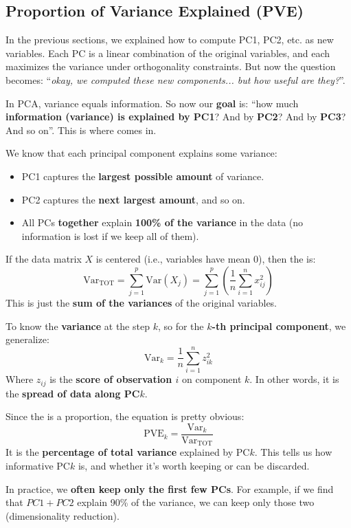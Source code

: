 \subsection{Proportion of Variance Explained (PVE)}

In the previous sections, we explained how to compute PC1, PC2, etc. as new variables. Each PC is a linear combination of the original variables, and each maximizes the variance under orthogonality constraints. But now the question becomes: ``\emph{okay, we computed these new components... but how useful are they?}''.

\highspace
In PCA, variance equals information. So now our \textbf{goal} is: ``how much \textbf{information (variance) is explained by PC1}? And by \textbf{PC2}? And by \textbf{PC3}? And so on''. This is where  comes in.

\highspace
We know that each principal component explains some variance:
\begin{itemize}
    \item PC1 captures the \textbf{largest possible amount} of variance.
    \item PC2 captures the \textbf{next largest amount}, and so on.
    \item All PCs \textbf{together} explain \textbf{100\% of the variance} in the data (no information is lost if we keep all of them).
\end{itemize}
If the data matrix $X$ is centered (i.e., variables have mean 0), then the  is:
\begin{equation}
    \text{Var}_{\text{TOT}} = \displaystyle\sum_{j=1}^{p} \text{Var}(X_{j}) = \displaystyle\sum_{j=1}^{p} \left( \dfrac{1}{n} \displaystyle\sum_{i=1}^{n} x_{ij}^{2} \right)
\end{equation}
This is just the \textbf{sum of the variances} of the original variables.

\highspace
To know the \textbf{variance} at the step $k$, so for the \textbf{$k$-th principal component}, we generalize:
\begin{equation}
    \text{Var}_{k} = \dfrac{1}{n} \displaystyle\sum_{i=1}^{n} z_{ik}^{2}
\end{equation}
Where $z_{ij}$ is the \textbf{score of observation $i$} on component $k$. In other words, it is the \textbf{spread of data along PC$k$}.

\highspace
Since the  is a proportion, the equation is pretty obvious:
\begin{equation}
    \text{PVE}_{k} = \dfrac{\text{Var}_{k}}{\text{Var}_{\text{TOT}}}
\end{equation}
It is the \textbf{percentage of total variance} explained by PC$k$. This tells us how informative PC$k$ is, and whether it's worth keeping or can be discarded.

\highspace
In practice, we \textbf{often keep only the first few PCs}. For example, if we find that $PC1 + PC2$ explain 90\% of the variance, we can keep only those two (dimensionality reduction).